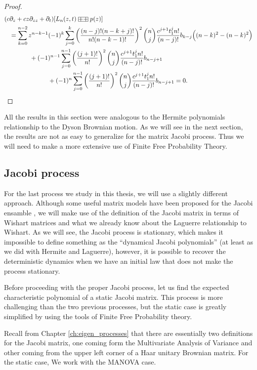 \begin{proof}
    \begin{align*}
        (c&\partial_z + cz\partial_{zz} + \partial_t )[L_n(z,t)\aac p(z)] \\  &= \sum_{k=0}^{n-2} z^{n-k-1}(-1)^k \sum_{j=0}^{k} \left(\frac{(n-j)!(n-k+j)!}{n!(n-k-1)!}\right)^2 \binom{n}{j}\frac{c^{j+1}t_1^{j}n!}{(n-j)!}b_{k-j}\Bigl((n-k)^2 - (n-k)^2\Bigr)\\ 
        &\phantom{espacio}+ (-1)^{n-1}\sum_{j=0}^{n-1} \left( \frac{(j+1)!}{n!} \right)^2\binom{n}{j}\frac{c^{j+1}t_1^{j}n!}{(n-j)!}b_{n-j+1}\\
        &\phantom{espaciooooooo} + (-1)^{n}\sum_{j=0}^{n-1} \left( \frac{(j+1)!}{n!} \right)^2\binom{n}{j}\frac{c^{j+1}t_1^{j}n!}{(n-j)!}b_{n-j+1} = 0.
    \end{align*}
\end{proof}

All the results in this section were analogous to the Hermite polynomials relationship to the Dyson Brownian motion. As we will see in the next section, the results are not as easy to generalize for the matrix Jacobi process. Thus we will need to make a more extensive use of Finite Free Probability Theory.

\subsection{Jacobi process}

For the last process we study in this thesis, we will use a slightly different approach. Although some useful matrix models have been proposed for the Jacobi ensamble \cite{article:jacobi_matrix_model,article:edelman_sutton_jacobi}, we will make use of the definition of the Jacobi matrix in terms of Wishart matrices and what we already know about the Laguerre relationship to Wishart. As we will see, the Jacobi process is stationary, which makes it impossible to define something as the ``dynamical Jacobi polynomials'' (at least as we did with Hermite and Laguerre), however, it is possible to recover the deterministic dynamics when we have an initial law that does not make the process stationary. 

Before proceeding with the proper Jacobi process, let us find the expected characteristic polynomial of a static Jacobi matrix. This process is more challenging than the two previous processes, but the static case is greatly simplified by using the tools of Finite Free Probability theory. 

Recall from Chapter \ref{ch:eigen_processes} that there are essentially two definitions for the Jacobi matrix, one coming form the Multivariate Analysis of Variance and other coming from the upper left corner of a Haar unitary Brownian matrix. For the static case, We work with the MANOVA case. 

